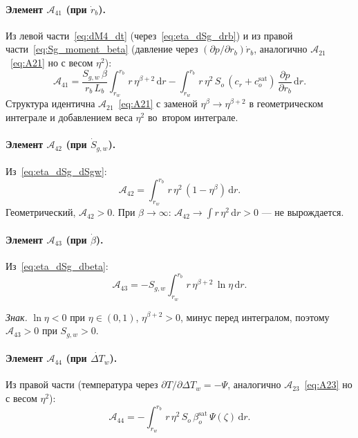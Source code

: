 \documentclass[12pt,a4paper]{article}
\newcommand{\dd}{\mathrm{d}}
\newcommand{\pp}{\partial}
\newcommand{\sat}{\mathrm{sat}}
\begin{document}
\paragraph{Элемент $\mathcal{A}_{41}$ (при $\dot{r}_b$).}
Из левой части~\eqref{eq:dM4_dt}
(через~\eqref{eq:eta_dSg_drb})
и из правой части~\eqref{eq:Sg_moment_beta}
(давление через $(\pp p/\pp r_b)\dot{r}_b$,
аналогично $\mathcal{A}_{21}$~\eqref{eq:A21}
но с весом $\eta^2$):
\begin{equation}\label{eq:A41}
  \boxed{
    \mathcal{A}_{41}
    = \frac{S_{g,w}\,\beta}{r_b\,L_b}
      \int_{r_w}^{r_b} r\,\eta^{\beta+2}\,\dd r
    - \int_{r_w}^{r_b} r\,\eta^2\,
      S_o\,(c_r + c_o^\sat)\,
      \frac{\pp p}{\pp r_b}\,\dd r.
  }
\end{equation}
Структура идентична $\mathcal{A}_{21}$~\eqref{eq:A21}
с заменой $\eta^\beta \to \eta^{\beta+2}$ в геометрическом
интеграле и добавлением веса $\eta^2$
во~втором интеграле.

\paragraph{Элемент $\mathcal{A}_{42}$ (при $\dot{S}_{g,w}$).}
Из~\eqref{eq:eta_dSg_dSgw}:
\begin{equation}\label{eq:A42}
  \boxed{
    \mathcal{A}_{42}
    = \int_{r_w}^{r_b} r\,\eta^2\,(1 - \eta^\beta)\,\dd r.
  }
\end{equation}
Геометрический, $\mathcal{A}_{42} > 0$.
При $\beta \to \infty$: $\mathcal{A}_{42} \to \int r\,\eta^2\,\dd r > 0$
--- не вырождается.

\paragraph{Элемент $\mathcal{A}_{43}$ (при $\dot\beta$).}
Из~\eqref{eq:eta_dSg_dbeta}:
\begin{equation}\label{eq:A43}
  \boxed{
    \mathcal{A}_{43}
    = -S_{g,w}\!\int_{r_w}^{r_b} r\,
      \eta^{\beta+2}\,\ln\eta\,\dd r.
  }
\end{equation}

\emph{Знак.} $\ln\eta < 0$ при $\eta \in (0,1)$,
$\eta^{\beta+2} > 0$,
минус перед интегралом, поэтому
$\mathcal{A}_{43} > 0$ при $S_{g,w} > 0$.

\paragraph{Элемент $\mathcal{A}_{44}$
  (при $\dot{\Delta T}_w$).}
Из правой части (температура через
$\pp T/\pp\Delta T_w = -\Psi$,
аналогично $\mathcal{A}_{23}$~\eqref{eq:A23}
но с весом $\eta^2$):
\begin{equation}\label{eq:A44}
  \boxed{
    \mathcal{A}_{44}
    = -\int_{r_w}^{r_b} r\,\eta^2\,
      S_o\,\beta_o^\sat\,\Psi(\zeta)\,\dd r.
  }
\end{equation}
\end{document}
